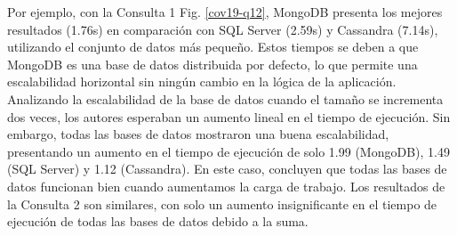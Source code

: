 \documentclass[pdflatex,sn-mathphys-num]{sn-jnl}
\theoremstyle{thmstyleone}%
\theoremstyle{thmstyletwo}%
\theoremstyle{thmstylethree}%
\begin{document}
\vspace{-0.5cm}

Por ejemplo, con la Consulta 1 Fig. \ref{cov19-q12}, MongoDB presenta los mejores resultados (1.76s) en comparación con SQL Server (2.59s) y Cassandra (7.14s), utilizando el conjunto de datos más pequeño. Estos tiempos se deben a que MongoDB es una base de datos distribuida por defecto, lo que permite una escalabilidad horizontal sin ningún cambio en la lógica de la aplicación. Analizando la escalabilidad de la base de datos cuando el tamaño se incrementa dos veces, los autores esperaban un aumento lineal en el tiempo de ejecución. Sin embargo, todas las bases de datos mostraron una buena escalabilidad, presentando un aumento en el tiempo de ejecución de solo 1.99 (MongoDB), 1.49 (SQL Server) y 1.12 (Cassandra). En este caso, concluyen que todas las bases de datos funcionan bien cuando aumentamos la carga de trabajo. Los resultados de la Consulta 2 son similares, con solo un aumento insignificante en el tiempo de ejecución de todas las bases de datos debido a la suma.
\end{document}
